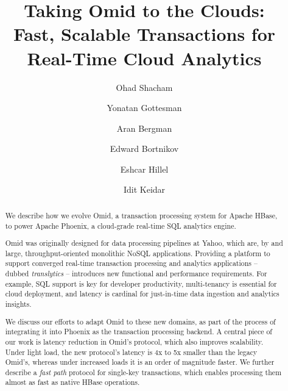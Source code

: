 \documentclass[sigconf,10pt, nonacm]{acmart}
\begin{document}
\title{Taking Omid to the Clouds: \\ 
Fast,  Scalable Transactions for Real-Time Cloud Analytics }

\author{Ohad Shacham}

\author{Yonatan Gottesman} %

\author{Aran Bergman}

\author{Edward Bortnikov}

\author{Eshcar Hillel}

\author{Idit Keidar}
       
\renewcommand{\shortauthors}{O. Shacham et al.}





\begin{abstract}


We describe how we evolve Omid, a transaction processing system for Apache HBase, 
to power Apache Phoenix, a cloud-grade real-time SQL analytics engine.  

Omid was originally designed for data processing pipelines at Yahoo, which are, by and large, 
throughput-oriented monolithic NoSQL applications. 
Providing a platform 
to support 
converged real-time transaction processing and analytics applications --
dubbed {\em translytics} --  
introduces new functional and performance requirements. For example, SQL 
support is key for developer productivity, multi-tenancy is essential for cloud deployment, 
and latency is cardinal for just-in-time data ingestion and analytics insights.

We discuss our efforts to adapt Omid to these new domains, 
as part of 
the process of integrating it into Phoenix as the transaction processing backend. A central piece
of our work is latency reduction in Omid's protocol, which also improves  scalability.  
Under light load, the new protocol's latency is 4x to 5x smaller than the legacy Omid's, whereas 
under increased loads it is an order of magnitude faster. We further describe a \emph{fast path} 
protocol for single-key transactions, which enables processing them almost as fast 
as native HBase operations.

\end{abstract}
\maketitle
\end{document}
